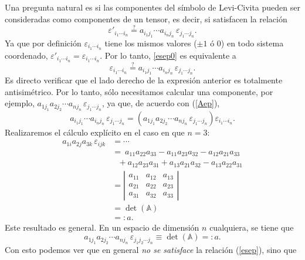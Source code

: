 Una pregunta natural es si las componentes del símbolo de Levi-Civita pueden ser consideradas como componentes de un tensor, es decir, si satisfacen la relación
\begin{equation}\label{esep0}
\varepsilon'_{i_1\cdots i_n}\stackrel{?}{=}a_{i_1j_1}\cdots a_{i_nj_n}\,\varepsilon_{j_1\cdots j_n}.
\end{equation}
Ya que por definición $\varepsilon_{i_1\cdots i_n}$  tiene los mismos valores ($\pm 1$ ó $0$) en todo sistema coordenado, $\varepsilon'_{i_1\cdots i_n}=\varepsilon_{i_1\cdots i_n}$. Por lo tanto, \eqref{esep0} es equivalente a
\begin{equation}\label{esep}
\varepsilon_{i_1\cdots i_n}\stackrel{?}{=}a_{i_1j_1}\cdots a_{i_nj_n}\,\varepsilon_{j_1\cdots j_n}.
\end{equation}
Es directo verificar que el lado derecho de la expresión anterior es totalmente antisimétrico. Por lo tanto, sólo necesitamos calcular una componente, por ejemplo, $a_{1j_1}a_{2j_2}\cdots a_{nj_n}\,\varepsilon_{j_1\cdots j_n}$, ya que, de acuerdo con (\ref{Aep}),
\begin{equation}
a_{i_1j_1}\cdots a_{i_nj_n}\,\varepsilon_{j_1\cdots j_n} =\left(a_{1j_1}a_{2j_2}\cdots a_{nj_n}\,\varepsilon_{j_1\cdots j_n}\right) \varepsilon_{i_1\cdots i_n}.
\end{equation}
Realizaremos el cálculo explícito en el caso en que $n=3$:
\begin{align}
a_{1i}a_{2j}a_{3k}\,\varepsilon_{ijk} &= \cdots \\
&=\ a_{11}a_{22}a_{33}-a_{11}a_{23}a_{32}-a_{12}a_{21}a_{33} \\
&\ \ \ +a_{12}a_{23}a_{31}+a_{13}a_{21}a_{32}-a_{13}a_{22}a_{31} \\
&= \left|\begin{array}{ccc}
a_{11} & a_{12} & a_{13} \\ 
a_{21} & a_{22} & a_{23} \\ 
a_{31} & a_{32} & a_{33}
\end{array} \right| \\
&=  \det(\mathbb{A}) \\
&=: a.
\end{align}
Este resultado es general. En un espacio de dimensión $n$ cualquiera, se tiene que
\begin{equation}
a_{1j_1}a_{2j_2}\cdots a_{nj_n}\,\varepsilon_{j_1j_2\cdots j_n}\equiv \det(\mathbb{A})=:a .
\end{equation}
Con esto podemos ver que en general \textit{no se satisface} la relación (\ref{esep}), sino que
